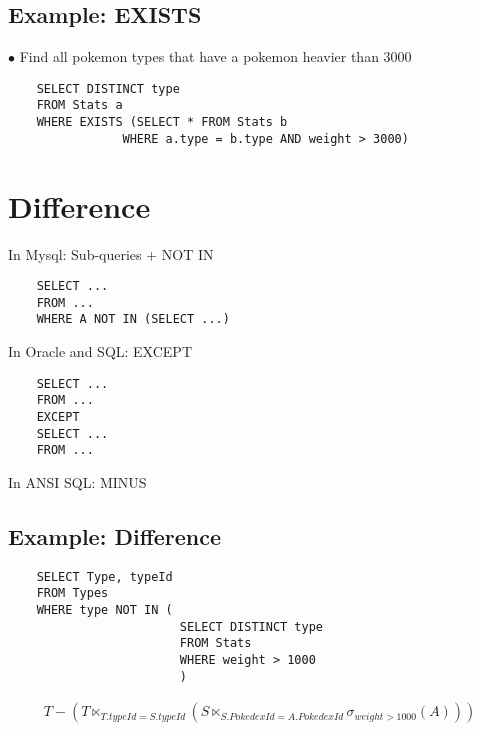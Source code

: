 \documentclass[twoside]{article}
\begin{document}
\subsection*{Example: EXISTS}
$\bullet$ Find all pokemon types that have a pokemon heavier than 3000
\begin{verbatim}
    SELECT DISTINCT type
    FROM Stats a
    WHERE EXISTS (SELECT * FROM Stats b
                WHERE a.type = b.type AND weight > 3000)
\end{verbatim}

\newpage
\hfill \break
{}

\section*{Difference}
In Mysql: Sub-queries + NOT IN
\begin{verbatim}
    SELECT ...
    FROM ...
    WHERE A NOT IN (SELECT ...)
\end{verbatim}

In Oracle and SQL: EXCEPT
\begin{verbatim}
    SELECT ...
    FROM ...
    EXCEPT
    SELECT ...
    FROM ...
\end{verbatim}

In ANSI SQL: MINUS

\subsection*{Example: Difference}
\begin{verbatim}
    SELECT Type, typeId
    FROM Types
    WHERE type NOT IN (
                        SELECT DISTINCT type
                        FROM Stats
                        WHERE weight > 1000
                        )
\end{verbatim}
\begin{gather}
    T - (T \ltimes_{T.typeId=S.typeId} (S \ltimes_{S.PokedexId=A.PokedexId} 
    \sigma_{weight > 1000}(A)))
\end{gather}
\end{document}
